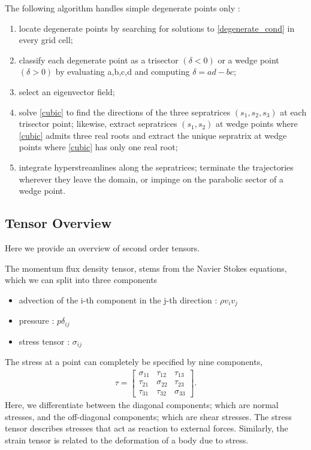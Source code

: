 \documentclass[main.tex]{subfiles}
\begin{document}
\vspace{3mm}\hspace{-6mm}The following algorithm handles simple degenerate points only :
\begin{enumerate}
\item locate degenerate points by searching for solutions to \eqref{degenerate_cond} in
every grid cell;
\item  classify each degenerate point as a trisector $(\delta < 0 )$ or a wedge point
$(\delta > 0 )$ by evaluating a,b,c,d and computing $\delta = ad - bc$;
\item select an eigenvector field;
\item solve \eqref{cubic} to find the directions of the three sepratrices $(s_1,s_2,s_3)$ at each
trisector point; likewise, extract sepratrices $(s_1,s_2)$ at wedge points where \eqref{cubic}
admits three real roots and extract the unique sepratrix at wedge points where \eqref{cubic}
has only one real root;
\item integrate hyperstreamlines along the sepratrices; terminate the trajectories wherever
they leave the domain, or impinge on the parabolic sector of a wedge point.
\end{enumerate}

\subsection{Tensor Overview}
Here we provide an overview of second order tensors.

The momentum flux density tensor, stems from the Navier Stokes equations, which we can
split into three components
\begin{itemize}
\item advection of the i-th component in the j-th direction : $\rho v_i v_j$
\item pressure : $p \delta_{ij}$
\item stress tensor :  $\sigma_{ij}$
\end{itemize}

The stress at a point can completely be specified \cite{KC08} by nine components, 
\begin{align*}
\tau = 
\begin{bmatrix}
\sigma_{11} & \tau_{12} & \tau_{13}\\
\tau_{21} & \sigma_{22} & \tau_{23}\\
\tau_{31} & \tau_{32} & \sigma_{33}
\end{bmatrix}.
\end{align*}
Here, we differentiate between the diagonal components; which are normal stresses, and
the off-diagonal components; which are shear stresses.
The stress tensor describes stresses that act as reaction to external forces. 
Similarly, the strain tensor is related to the deformation of a body
due to stress.
\end{document}
